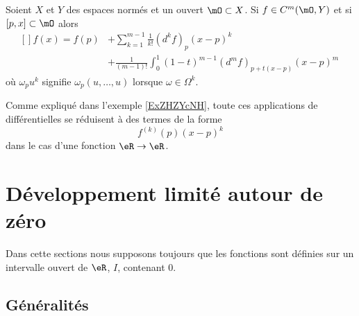 \begin{proposition}\label{PropAXaSClx}
    Soient \( X\) et \( Y\) des espaces normés et un ouvert \( \mO\subset X\). Si \( f\in C^m(\mO,Y)\) et si \( [p,x]\subset \mO\) alors
    \begin{equation}
        \begin{aligned}[]
            f(x)=f(p)&+\sum_{k=1}^{m-1}\frac{1}{ k! }(d^kf)_p (x-p)^k \\
            &+\frac{1}{ (m-1)! }\int_0^1(1-t)^{m-1}(d^mf)_{ p+t(x-p) }(x-p)^m \
        \end{aligned}
    \end{equation}
    où \( \omega_pu^k\) signifie \( \omega_p(u,\ldots, u)\) lorsque \( \omega\in \Omega^k\).
\end{proposition}
Comme expliqué dans l'exemple \ref{ExZHZYcNH}, toute ces applications de différentielles se réduisent à des termes de la forme
\begin{equation}
    f^{(k)}(p)(x-p)^k
\end{equation}
dans le cas d'une fonction \( \eR\to\eR\).

\section{Développement limité autour de zéro}

Dans cette sections nous supposons toujours que les fonctions sont définies sur un intervalle ouvert de $\eR$, $I$, contenant \( 0\).

\subsection{Généralités}

